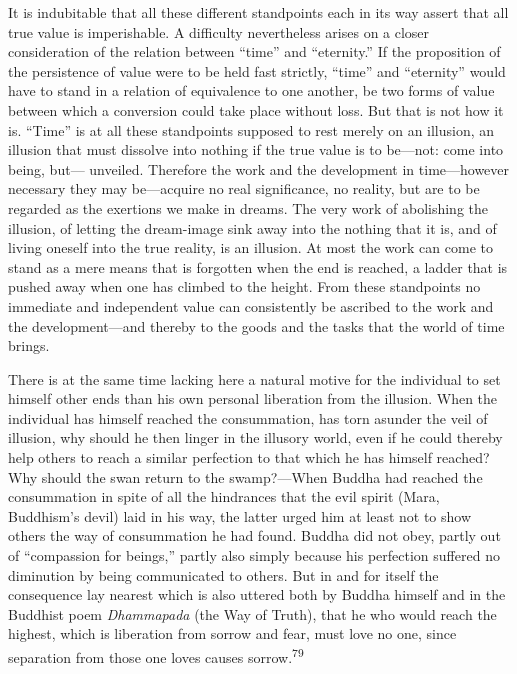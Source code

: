 \documentclass[12pt,a4paper]{book}
\newcommand{\opage}[1]{\marginnote{\footnotesize\textit{[#1]}}}
\begin{document}
It is indubitable that all these different standpoints each in its way assert that all true value is
imperishable. A difficulty nevertheless arises on a closer consideration of the relation between
``time'' and ``eternity.'' If the proposition of the persistence of value were to be held fast
strictly, ``time'' and ``eternity'' would have to stand in a relation of equivalence to one another,
be two forms of value between which a conversion could take place without loss.
\opage{157}But that is not how it is. ``Time'' is at all these standpoints supposed to rest merely on an illusion,
an illusion that must dissolve into nothing if the true value is to be---not: come into being, but---
unveiled. Therefore the work and the development in time---however necessary they may be---acquire no
real significance, no reality, but are to be regarded as the exertions we make in dreams. The very work
of abolishing the illusion, of letting the dream-image sink away into the nothing that it is, and of
living oneself into the true reality, is an illusion. At most the work can come to stand as a mere
means that is forgotten when the end is reached, a ladder that is pushed away when one has climbed to
the height. From these standpoints no immediate and independent value can consistently be ascribed to
the work and the development---and thereby to the goods and the tasks that the world of time brings.

There is at the same time lacking here a natural motive for the individual to set himself other ends
than his own personal liberation from the illusion. When the individual has himself reached the
consummation, has torn asunder the veil of illusion, why should he then linger in the illusory world,
even if he could thereby help others to reach a similar perfection to that which he has himself reached?
Why should the swan return to the swamp?---When Buddha had reached the consummation in spite of all the
hindrances that the evil spirit (Mara, Buddhism's devil) laid in his way, the latter urged him at least
not to show others the way of consummation he had found. Buddha did not obey, partly out of ``compassion
for beings,'' partly also simply because his perfection suffered no diminution by being communicated to
others. But in and for itself the consequence lay nearest which is also uttered both by Buddha himself
and in the Buddhist poem \emph{Dhammapada} (the Way of Truth), that he who would reach the highest, which
is liberation from sorrow and fear, must love no one, since separation from those one loves causes
sorrow.\textsuperscript{79}
\end{document}
